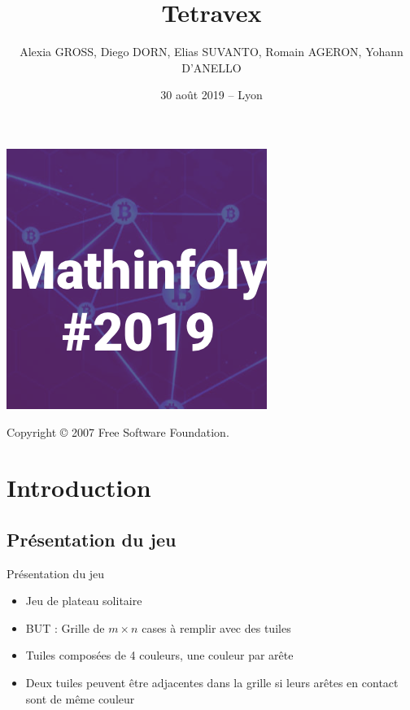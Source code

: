 \documentclass[aspectratio=43,11pt,hyperref={pdfpagemode=FullScreen}]{beamer}
\author{Alexia GROSS, Diego DORN, Elias SUVANTO, Romain AGERON, Yohann D'ANELLO}
\title{Tetravex}
\date{30 août 2019 -- Lyon}
\begin{document}
\begin{frame}{}
\titlepage

\begin{minipage}{0.55 \linewidth}
\includegraphics[scale=0.2]{Logo_Mathinfoly.png}
\end{minipage}\hfill
\begin{minipage}{0.3 \linewidth}
\begin{flushright}
{\tiny Copyright \copyright{} 2007 Free Software Foundation.}
\end{flushright} 
\end{minipage}


\end{frame}

\begin{frame}{}
\tableofcontents
\end{frame}

\section{Introduction}

\subsection{Présentation du jeu}

\begin{frame}{Présentation du jeu}
\begin{itemize}
    \item Jeu de plateau solitaire
    \pause
    \item BUT : Grille de $m \times n$ cases à remplir avec des tuiles
    \pause
    \item Tuiles composées de 4 couleurs, une couleur par arête
    \pause
    \item Deux tuiles peuvent être adjacentes dans la grille si leurs arêtes en contact sont de même couleur
\end{itemize}
\end{frame}
\end{document}
